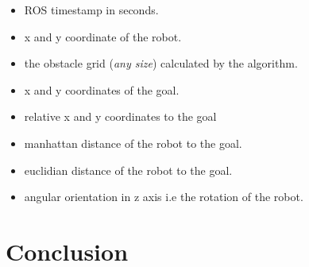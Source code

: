 \begin{itemize}
    \item ROS timestamp in seconds.
    \item x and y coordinate of the robot.
    \item the obstacle grid (\textit{any size}) calculated by the algorithm.
    \item x and y coordinates of the goal.
    \item relative x and y coordinates to the goal
    \item manhattan distance of the robot to the goal.
    \item euclidian distance of the robot to the goal.
    \item angular orientation in z axis i.e the rotation of the robot.
\end{itemize}

\section{Conclusion}
